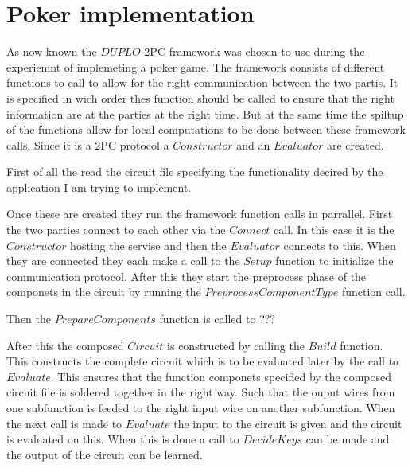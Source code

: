 \section{Poker implementation}

As now known the $DUPLO$ 2PC framework was chosen to use during the experiemnt of implemeting a poker game. The framework consists of different functions to call to allow for the right communication between the two partis. It is specified in wich order thes function should be called to ensure that the right information are at the parties at the right time. But at the same time the spiltup of the functions allow for local computations to be done between these framework calls. Since it is a 2PC protocol a $Constructor$ and an $Evaluator$ are created.

First of all the read the circuit file specifying the functionality decired by the application I am trying to implement.


Once these are created they run the framework function calls in parrallel. First the two parties connect to each other via the $Connect$ call. In this case it is the $Constructor$ hosting the servise and then the $Evaluator$ connects to this. When they are connected they each make a call to the $Setup$ function to initialize the communication protocol. After this they start the preprocess phase of the componets in the circuit by running the $PreprocessComponentType$ function call.


Then the $PrepareComponents$ function is called to ???


After this the composed $Circuit$ is constructed by calling the $Build$ function. This constructs the complete circuit which is to be evaluated later by the call to $Evaluate$. This ensures that the function componets specified by the composed circuit file is soldered together in the right way. Such that the ouput wires from one subfunction is feeded to the right input wire on another subfunction. When the next call is made to $Evaluate$ the input to the circuit is given and the circuit is evaluated on this. When this is done a call to $DecideKeys$ can be made and the output of the circuit can be learned.

